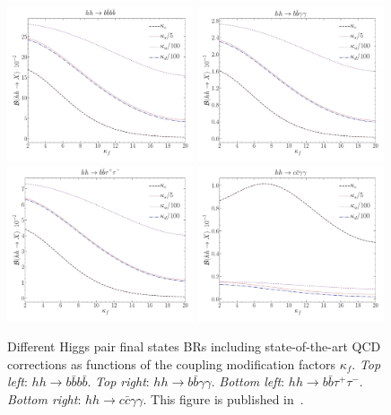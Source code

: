 \begin{figure}[!t]
	\centering
	\includegraphics[width = 0.49\textwidth]{./fig/br_bbbb_kf}
	\includegraphics[width = 0.49\textwidth]{./fig/br_bbgg_kf}
	\\
	\includegraphics[width = 0.49\textwidth]{./fig/br_bbll_kf}
	\includegraphics[width = 0.49\textwidth]{./fig/br_ccgg_kf}
	\caption{Different Higgs pair final states BRs including state-of-the-art QCD corrections as functions of the coupling modification factors $\kappa_f$. \textit{Top left}: $ hh \to b \bar b b \bar b$. \textit{Top right}: $ hh \to b \bar b \gamma \gamma$. \textit{Bottom left}: $ hh \to b \bar b \tau^+ \tau^-$. \textit{Bottom right}: $ hh \to c \bar c \gamma \gamma$. This figure is published in~\cite{Alasfar:2019pmn}.  }
	\label{brs}
\end{figure}

